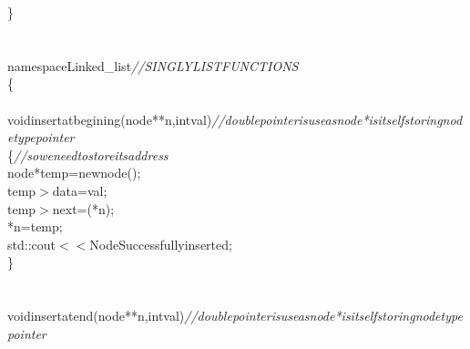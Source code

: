 \documentclass[a4paper, 9pt]{article}
\newcommand\SPC{\hspace*{0.6em}}
\newcommand\TAB{\hspace*{1.2em}}
\newcommand\HYP{\mbox{\char 45}}
\newcommand\QOT{\mbox{\char 34}}
\newcommand{\CppAComment}[1]{\textit{\textcolor[rgb]{0.4,0.45,0.48}{#1}}}
\newcommand{\CppAIdentifier}[1]{\textcolor[rgb]{0.88,0.89,0.89}{#1}}
\newcommand{\CppAReservedWord}[1]{\textcolor[rgb]{0.4,0.55,0.69}{#1}}
\newcommand{\CppASpace}[1]{\colorbox[rgb]{0.16,0.19,0.2}{#1}}
\newcommand{\CppAString}[1]{\textcolor[rgb]{0.93,0.46,0}{#1}}
\newcommand{\CppASymbol}[1]{\textcolor[rgb]{0.91,0.89,0.72}{#1}}
\begin{document}
\begin{ttfamily}
\CppASymbol{\}}\\
\\
\\
\CppAReservedWord{namespace}\CppASpace{\SPC }\CppAIdentifier{Linked\_list}\CppASpace{\SPC \SPC }\CppAComment{//SINGLYLISTFUNCTIONS}\\
\CppASymbol{\{}\\
\CppASpace{\TAB \TAB }\\
\CppASpace{\TAB }\CppAReservedWord{void}\CppASpace{\SPC \SPC }\CppAIdentifier{insertatbegining}\CppASymbol{(}\CppASpace{\SPC }\CppAIdentifier{node}\CppASymbol{*}\CppASymbol{*}\CppASpace{\SPC }\CppAIdentifier{n}\CppASymbol{,}\CppAReservedWord{int}\CppASpace{\SPC }\CppAIdentifier{val}\CppASymbol{)}\CppAComment{//double\SPC pointer\SPC is\SPC use\SPC as\SPC node\SPC *\SPC is\SPC itself\SPC storing\SPC node\SPC type\SPC pointer\SPC }\\
\CppASpace{\TAB }\CppASymbol{\{}\CppASpace{\SPC \SPC \SPC \SPC \SPC \SPC \SPC \SPC \SPC \SPC \SPC \SPC \SPC \SPC \SPC \SPC \SPC \SPC \SPC \SPC \SPC \SPC \SPC \SPC \SPC \SPC \SPC \SPC }\CppAComment{//\SPC so\SPC we\SPC need\SPC to\SPC store\SPC its\SPC address}\\
\CppASpace{\TAB \TAB }\CppAIdentifier{node}\CppASymbol{*}\CppASpace{\SPC }\CppAIdentifier{temp}\CppASpace{\SPC }\CppASymbol{=}\CppAReservedWord{new}\CppASpace{\SPC }\CppAIdentifier{node}\CppASymbol{(}\CppASymbol{)}\CppASymbol{;}\\
\CppASpace{\TAB \SPC \SPC \SPC \SPC }\CppAIdentifier{temp}\CppASymbol{\HYP $>$}\CppAIdentifier{data}\CppASymbol{=}\CppAIdentifier{val}\CppASymbol{;}\\
\CppASpace{\TAB \SPC \SPC \SPC \SPC }\CppAIdentifier{temp}\CppASymbol{\HYP $>$}\CppAIdentifier{next}\CppASymbol{=}\CppASymbol{(}\CppASymbol{*}\CppAIdentifier{n}\CppASymbol{)}\CppASymbol{;}\\
\CppASpace{\TAB \SPC \SPC \SPC \SPC }\CppASymbol{*}\CppAIdentifier{n}\CppASymbol{=}\CppAIdentifier{temp}\CppASymbol{;}\\
\CppASpace{\TAB \SPC \SPC \SPC \SPC }\CppAIdentifier{std}\CppASymbol{::}\CppAIdentifier{cout}\CppASymbol{$<$$<$}\CppAString{\QOT Node\SPC Successfully\SPC inserted\QOT }\CppASymbol{;}\\
\CppASpace{\TAB }\CppASymbol{\}}\\
\CppASpace{\TAB }\\
\CppASpace{\TAB }\\
\CppASpace{\TAB }\CppAReservedWord{void}\CppASpace{\SPC \SPC }\CppAIdentifier{insertatend}\CppASymbol{(}\CppASpace{\SPC }\CppAIdentifier{node}\CppASymbol{*}\CppASymbol{*}\CppASpace{\SPC }\CppAIdentifier{n}\CppASymbol{,}\CppAReservedWord{int}\CppASpace{\SPC }\CppAIdentifier{val}\CppASymbol{)}\CppAComment{//double\SPC pointer\SPC is\SPC use\SPC as\SPC node\SPC *\SPC is\SPC itself\SPC storing\SPC node\SPC type\SPC pointer\SPC }\\

\end{ttfamily}
\end{document}
